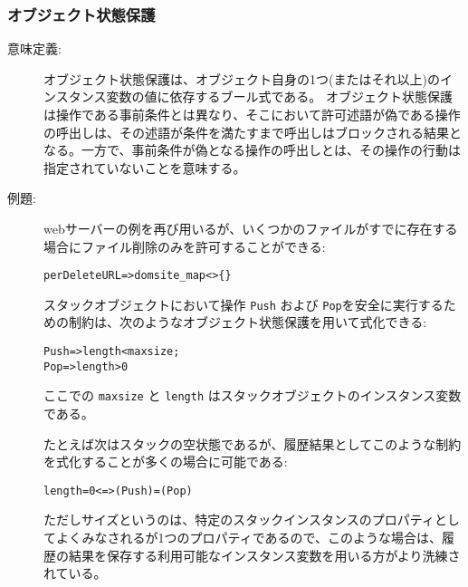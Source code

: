 \documentclass[\pformat,12pt]{jarticle}
\begin{document}
\subsubsection{オブジェクト状態保護}
\begin{description}
\item[意味定義:] 
オブジェクト状態保護は、オブジェクト自身の1つ(またはそれ以上)のインスタンス変数の値に依存するブール式である。
オブジェクト状態保護は操作である事前条件とは異なり、そこにおいて許可述語が偽である操作の呼出しは、その述語が条件を満たすまで呼出しはブロックされる結果となる。一方で、事前条件が偽となる操作の呼出しとは、その操作の行動は指定されていないことを意味する。

\item[例題:] 
webサーバーの例を再び用いるが、いくつかのファイルがすでに存在する場合にファイル削除のみを許可することができる:
\begin{alltt}
    per DeleteURL   => dom site_map <> \{\}
\end{alltt}

スタックオブジェクトにおいて操作 {\tt Push} および {\tt Pop}を安全に実行するための制約は、次のようなオブジェクト状態保護を用いて式化できる:
\begin{alltt}
     Push => length < maxsize;\\
     Pop => length > 0
\end{alltt}
ここでの {\tt maxsize} と {\tt length} はスタックオブジェクトのインスタンス変数である。

たとえば次はスタックの空状態であるが、履歴結果としてこのような制約を式化することが多くの場合に可能である:
\begin{alltt}
    length = 0 <=> (Push) = (Pop)
\end{alltt}
ただしサイズというのは、特定のスタックインスタンスのプロパティとしてよくみなされるが1つのプロパティであるので、このような場合は、履歴の結果を保存する利用可能なインスタンス変数を用いる方がより洗練されている。

%
\end{description}
\end{document}
